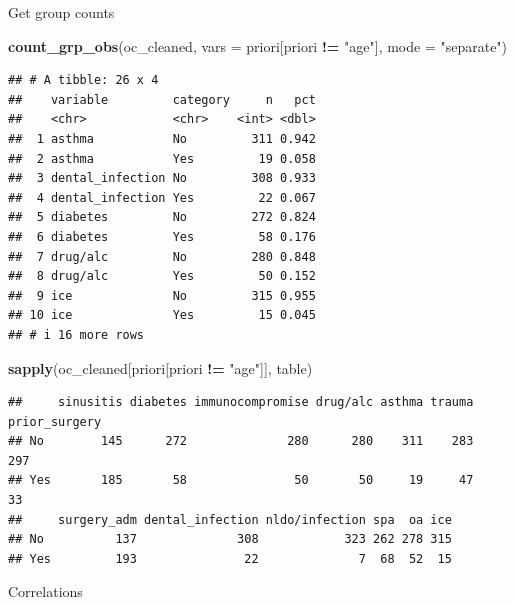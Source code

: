 \documentclass[
]{article}
\newenvironment{Shaded}{\begin{snugshade}}{\end{snugshade}}
\newcommand{\AttributeTok}[1]{\textcolor[rgb]{0.13,0.29,0.53}{#1}}
\newcommand{\FunctionTok}[1]{\textcolor[rgb]{0.13,0.29,0.53}{\textbf{#1}}}
\newcommand{\NormalTok}[1]{#1}
\newcommand{\SpecialCharTok}[1]{\textcolor[rgb]{0.81,0.36,0.00}{\textbf{#1}}}
\newcommand{\StringTok}[1]{\textcolor[rgb]{0.31,0.60,0.02}{#1}}
\begin{document}
Get group counts

\begin{Shaded}
\begin{Highlighting}[]
\FunctionTok{count\_grp\_obs}\NormalTok{(oc\_cleaned, }\AttributeTok{vars =}\NormalTok{ priori[priori }\SpecialCharTok{!=} \StringTok{"age"}\NormalTok{], }
              \AttributeTok{mode =} \StringTok{"separate"}\NormalTok{)}
\end{Highlighting}
\end{Shaded}

\begin{verbatim}
## # A tibble: 26 x 4
##    variable         category     n   pct
##    <chr>            <chr>    <int> <dbl>
##  1 asthma           No         311 0.942
##  2 asthma           Yes         19 0.058
##  3 dental_infection No         308 0.933
##  4 dental_infection Yes         22 0.067
##  5 diabetes         No         272 0.824
##  6 diabetes         Yes         58 0.176
##  7 drug/alc         No         280 0.848
##  8 drug/alc         Yes         50 0.152
##  9 ice              No         315 0.955
## 10 ice              Yes         15 0.045
## # i 16 more rows
\end{verbatim}

\begin{Shaded}
\begin{Highlighting}[]
\FunctionTok{sapply}\NormalTok{(oc\_cleaned[priori[priori }\SpecialCharTok{!=} \StringTok{"age"}\NormalTok{]], table) }
\end{Highlighting}
\end{Shaded}

\begin{verbatim}
##     sinusitis diabetes immunocompromise drug/alc asthma trauma prior_surgery
## No        145      272              280      280    311    283           297
## Yes       185       58               50       50     19     47            33
##     surgery_adm dental_infection nldo/infection spa  oa ice
## No          137              308            323 262 278 315
## Yes         193               22              7  68  52  15
\end{verbatim}

Correlations
\end{document}
